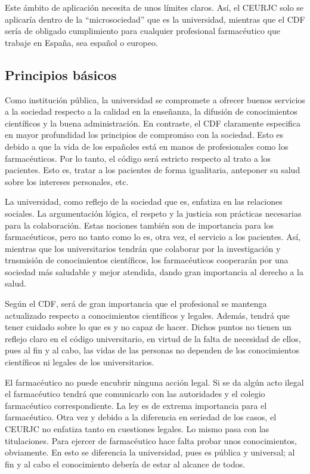 \documentclass[11pt,a4paper]{article}
\begin{document}
Este ámbito de aplicación necesita de unos límites claros. Así, el CEURJC solo se aplicaría dentro de la ``microsociedad'' que es la universidad, mientras que el CDF sería de obligado cumplimiento para cualquier profesional farmacéutico que trabaje en España, sea español o europeo. 

\subsection{Principios básicos}
Como institución pública, la universidad se compromete a ofrecer buenos servicios a la sociedad respecto a la calidad en la enseñanza, la difusión de conocimientos científicos y la buena administración. En contraste, el CDF claramente especifica en mayor profundidad los principios de compromiso con la sociedad. Esto es debido a que la vida de los españoles está en manos de profesionales como los farmacéuticos. Por lo tanto, el código será estricto respecto al trato a los pacientes. Esto es, tratar a los pacientes de forma igualitaria, anteponer su salud sobre los intereses personales, etc. 

La universidad, como reflejo de la sociedad que es, enfatiza en las relaciones sociales. La argumentación lógica, el respeto y la justicia son prácticas necesarias para la colaboración. Estas nociones también son de importancia para los farmacéuticos, pero no tanto como lo es, otra vez, el servicio a los pacientes. Así, mientras que los universitarios tendrán que colaborar por la investigación y trnsmisión de conocimientos científicos, los farmacéuticos cooperarán por una sociedad más saludable y mejor atendida, dando gran importancia al derecho a la salud. 

Según el CDF, será de gran importancia que el profesional se mantenga actualizado respecto a conocimientos científicos y legales. Además, tendrá que tener cuidado sobre lo que es y no capaz de hacer. Dichos puntos no tienen un reflejo claro en el código universitario, en virtud de la falta de necesidad de ellos, pues al fin y al cabo, las vidas de las personas no dependen de los conocimientos científicos ni legales de los universitarios. 

El farmacéutico no puede encubrir ninguna acción legal. Si se da algún acto ilegal el farmacéutico tendrá que comunicarlo con las autoridades y el colegio farmacéutico correspondiente. La ley es de extrema importancia para el farmacéutico. Otra vez y debido a la diferencia en seriedad de los casos, el CEURJC no enfatiza tanto en cuestiones legales. Lo mismo pasa con las titulaciones. Para ejercer de farmacéutico hace falta probar unos conocimientos, obviamente. En esto se diferencia la universidad, pues es pública y universal; al fin y al cabo el conocimiento debería de estar al alcance de todos. 
\end{document}
